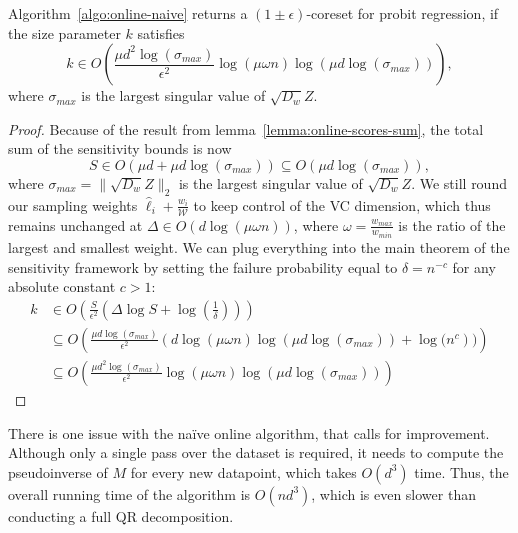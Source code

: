 \begin{theorem}
    Algorithm~\ref{algo:online-naive} returns a $(1 \pm \epsilon)$-coreset
    for probit regression, if the size parameter $k$ satisfies
    \begin{equation*}
        k \in O\left(\frac{\mu d^2 \log(\sigma_{max})}{\epsilon^2}\log(\mu \omega n) \log(\mu d \log(\sigma_{max}))\right),
    \end{equation*}
    where $\sigma_{max}$ is the largest singular value of $\sqrt{D_w}Z$.
\end{theorem}
\begin{proof}
    Because of the result from lemma~\ref{lemma:online-scores-sum},
    the total sum of the sensitivity bounds is
    now
    \begin{equation*}
        S \in O(\mu d + \mu d \log(\sigma_{max}))
        \subseteq O(\mu d \log(\sigma_{max})),
    \end{equation*}
    where $\sigma_{max} = \lVert \sqrt{D_w}Z \rVert_2$ is
    the largest singular value of $\sqrt{D_w}Z$.
    We still round our sampling weights
    $\hat{\ell}_i + \frac{w_i}{\mathcal{W}}$ to keep control of the
    VC dimension, which thus remains unchanged at
    $\Delta \in O(d\log(\mu\omega n))$, where
    $\omega = \frac{w_{max}}{w_{min}}$ is the ratio of the
    largest and smallest weight.
    We can plug everything into the main theorem of the sensitivity
    framework by setting the failure probability equal to
    $\delta = n^{-c}$ for any absolute constant $c > 1$:
    \begin{align*}
        k & \in O\left( \frac{S}{\epsilon^2} \left(\Delta \log S + \log\left(\frac{1}{\delta}\right)\right)\right)                 \\
          & \subseteq O\left(\frac{\mu d \log(\sigma_{max}) }
            {\epsilon^2}\left(d \log(\mu \omega n) \log(\mu d \log(\sigma_{max})) +
            \log(n^c\right))\right)                                                                                                \\
          & \subseteq O\left(\frac{\mu d^2 \log(\sigma_{max})}{\epsilon^2}\log(\mu \omega n) \log(\mu d \log(\sigma_{max}))\right)
    \end{align*}
\end{proof}

There is one issue with the na\"ive online algorithm, that calls for
improvement. Although only a single pass over the dataset is required,
it needs to compute the pseudoinverse of $M$ for every new
datapoint, which takes $O(d^3)$ time. Thus, the overall running time
of the algorithm is $O(nd^3)$, which is even slower than conducting
a full QR decomposition.

